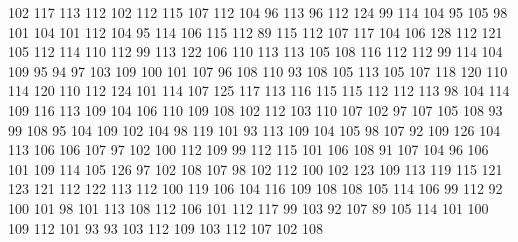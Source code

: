 102 117 113 112 102 112 115 107 112 104 96 113 96 112 124 99 114 104 95 105
98 101 104 101 112 104 95 114 106 115 112 89 115 112 107 117 104 106 128 112
121 105 112 114 110 112 99 113 122 106 110 113 113 105 108 116 112 112 99 114
104 109 95 94 97 103 109 100 101 107 96 108 110 93 108 105 113 105 107 118
120 110 114 120 110 112 124 101 114 107 125 117 113 116 115 115 112 112 113 98
104 114 109 116 113 109 104 106 110 109 108 102 112 103 110 107 102 97 107 105
108 93 99 108 95 104 109 102 104 98 119 101 93 113 109 104 105 98 107 92
109 126 104 113 106 106 107 97 102 100 112 109 99 112 115 101 106 108 91 107
104 96 106 101 109 114 105 126 97 102 108 107 98 102 112 100 102 123 109 113
119 115 121 123 121 112 122 113 112 100 119 106 104 116 109 108 108 105 114 106
99 112 92 100 101 98 101 113 108 112 106 101 112 117 99 103 92 107 89 105
114 101 100 109 112 101 93 93 103 112 109 103 112 107 102 108
